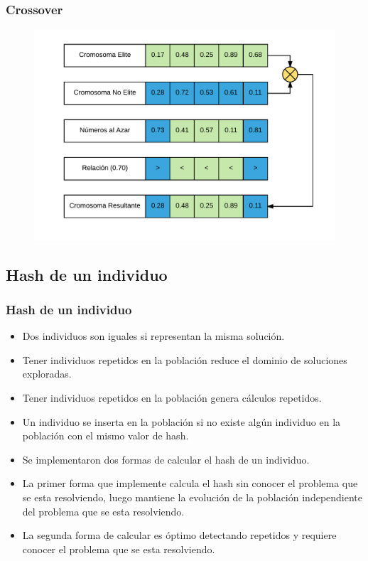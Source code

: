 \documentclass{beamer}
\begin{document}

\begin{frame}
\frametitle{Crossover}

\begin{figure}[h]
	\centering
	\includegraphics[width=12cm]{BiasCrossover}
	\label{fig:BiasCrossover}
\end{figure}

\end{frame}


\subsection{Hash de un individuo}

\begin{frame}
\frametitle{Hash de un individuo}

\begin{itemize}
    \item Dos individuos son iguales si representan la misma solución.
    \pause
    \item Tener individuos repetidos en la población reduce el dominio de soluciones exploradas.
    \pause
    \item Tener individuos repetidos en la población genera cálculos repetidos.
    \pause
    \item Un individuo se inserta en la población si no existe algún individuo en la población con el mismo valor de hash.
    \pause
    \item Se implementaron dos formas de calcular el hash de un individuo.
    \pause
    \item La primer forma que implemente calcula el hash sin conocer el problema que se esta resolviendo, luego mantiene la evolución de la población independiente del problema que se esta resolviendo.
    \pause
    \item La segunda forma de calcular es óptimo detectando repetidos y requiere conocer el problema que se esta resolviendo.
\end{itemize}

\end{frame}
\end{document}

